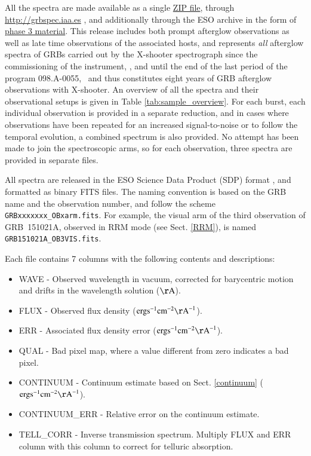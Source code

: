 \documentclass[longauth]{aa}    %
\begin{document}
All the spectra are made available as a single
\href{https://sid.erda.dk/cgi-sid/ls.py?share_id=DBuNORk1lI}{ZIP file}, through
\url{http://grbspec.iaa.es} \citep{DeUgartePostigo2014f}, and additionally through the ESO archive in the
form of \href{http://archive.eso.org/wdb/wdb/adp/phase3_main/form}{phase 3
	material}. This release includes both prompt afterglow observations as well as
late time observations of the associated hosts, and represents \textit{all}
afterglow spectra of GRBs carried out by the X-shooter spectrograph since the
commissioning of the instrument, \startdate, and until the end of the last
period of the program 098.A-0055, \termdate~and thus constitutes eight years of GRB
afterglow observations with X-shooter. An overview of all the spectra and their
observational setups is given in Table \ref{tab:sample_overview}. For each
burst, each individual observation is provided in a separate reduction, and in
cases where observations have been repeated for an increased signal-to-noise or
to follow the temporal evolution, a combined spectrum is also provided. No
attempt has been made to join the spectroscopic arms, so for each observation,
three spectra are provided in separate files.

All spectra are released in the ESO Science Data Product (SDP) format
\citep{Micol2016}, and formatted as binary FITS files. The naming convention is
based on the GRB name and the observation number, and follow the scheme
\texttt{GRBxxxxxxx\_OBxarm.fits}. For example, the visual arm of the third
observation of GRB~151021A, observed in RRM mode (see Sect. \ref{RRM}), is named
\texttt{GRB151021A\_OB3VIS.fits}.

Each file contains 7 columns with the following contents and descriptions:
\begin{itemize}
	
	\item WAVE - Observed wavelength in vacuum, corrected for barycentric motion
	and drifts in the wavelength solution ($\mathrm{\AA}$).
	
	\item FLUX - Observed flux density ($\mathrm{erg} \mathrm{s}^{-1}
	\mathrm{cm}^{-2} \mathrm{\AA}^{-1}$).
	
	\item ERR - Associated flux density error ($\mathrm{erg} \mathrm{s}^{-1}
	\mathrm{cm}^{-2} \mathrm{\AA}^{-1}$).
	
	\item QUAL - Bad pixel map, where a value different from zero indicates a bad
	pixel.
	
	\item CONTINUUM - Continuum estimate based on Sect. \ref{continuum}
	($\mathrm{erg} \mathrm{s}^{-1} \mathrm{cm}^{-2} \mathrm{\AA}^{-1}$).
	
	\item CONTINUUM\_ERR - Relative error on the continuum estimate.
	
	\item TELL\_CORR - Inverse transmission spectrum. Multiply FLUX and ERR column
	with this column to correct for telluric absorption.
	 
\end{itemize}
\end{document}
